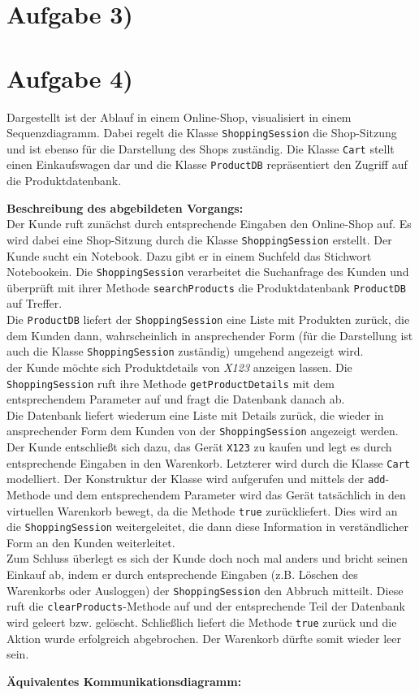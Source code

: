 \documentclass{swp1}
\begin{document}
\section*{Aufgabe 3)}
\section*{Aufgabe 4)}

Dargestellt ist der Ablauf in einem Online-Shop, visualisiert in einem Sequenzdiagramm. Dabei regelt die Klasse \texttt{ShoppingSession} die Shop-Sitzung und ist ebenso für die Darstellung des Shops zuständig. Die Klasse \texttt{Cart} stellt einen Einkaufswagen dar und die Klasse \texttt{ProductDB} repräsentiert den Zugriff auf die Produktdatenbank.

\textbf{Beschreibung des abgebildeten Vorgangs:}\\
Der Kunde ruft zunächst durch entsprechende Eingaben den Online-Shop auf. Es wird dabei eine Shop-Sitzung durch die Klasse \texttt{ShoppingSession} erstellt. Der Kunde sucht ein Notebook. Dazu gibt er in einem Suchfeld das Stichwort \glqq Notebook\grqq ein. Die \texttt{ShoppingSession} verarbeitet die Suchanfrage des Kunden und überprüft mit ihrer Methode \texttt{searchProducts} die Produktdatenbank \texttt{ProductDB} auf Treffer.\\
Die \texttt{ProductDB} liefert der \texttt{ShoppingSession} eine Liste mit Produkten zurück, die dem Kunden dann, wahrscheinlich in ansprechender Form (für die Darstellung ist auch die Klasse \texttt{ShoppingSession} zuständig) umgehend angezeigt wird.\\
der Kunde möchte sich Produktdetails von \textit{X123} anzeigen lassen. Die \texttt{ShoppingSession} ruft ihre Methode \texttt{getProductDetails} mit dem entsprechendem Parameter auf und fragt die Datenbank danach ab. \\
Die Datenbank liefert wiederum eine Liste mit Details zurück, die wieder in ansprechender Form dem Kunden von der \texttt{ShoppingSession} angezeigt werden.\\
Der Kunde entschließt sich dazu, das Gerät \texttt{X123} zu kaufen und legt es durch entsprechende Eingaben in den Warenkorb. Letzterer wird durch die Klasse \texttt{Cart} modelliert. Der Konstruktur der Klasse wird aufgerufen und mittels der \texttt{add}-Methode und dem entsprechendem Parameter wird das Gerät tatsächlich in den virtuellen Warenkorb bewegt, da die Methode \texttt{true} zurückliefert. Dies wird an die \texttt{ShoppingSession} weitergeleitet, die dann diese Information in verständlicher Form an den Kunden weiterleitet. \\
Zum Schluss überlegt es sich der Kunde doch noch mal anders und bricht seinen Einkauf ab, indem er durch entsprechende Eingaben (z.B. Löschen des Warenkorbs oder Ausloggen) der \texttt{ShoppingSession} den Abbruch mitteilt. Diese ruft die \texttt{clearProducts}-Methode auf und der entsprechende Teil der Datenbank wird geleert bzw. gelöscht. Schließlich liefert die Methode \texttt{true} zurück und die Aktion wurde erfolgreich abgebrochen. Der Warenkorb dürfte somit wieder leer sein.



\textbf{Äquivalentes Kommunikationsdiagramm:}\\
\end{document}
